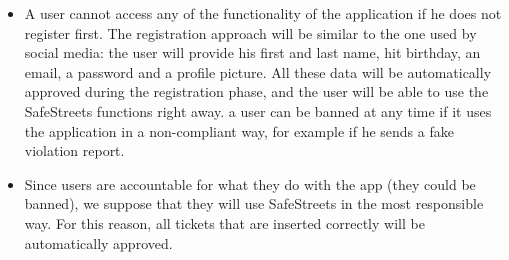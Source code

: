 \begin{itemize}
    \item A user cannot access any of the functionality of the application if he does not register first.
        The registration approach will be similar to the one used by social media: the user will provide his first and last name, hit birthday, an email, a password and a profile picture.
        All these data will be automatically approved during the registration phase, and the user will be able to use the SafeStreets functions right away.
        a user can be banned at any time if it uses the application in a non-compliant way, for example if he sends a fake violation report.
    \item Since users are accountable for what they do with the app (they could be banned), we suppose that they will use SafeStreets
        in the most responsible way. For this reason, all tickets that are inserted correctly will be automatically approved.
\end{itemize}